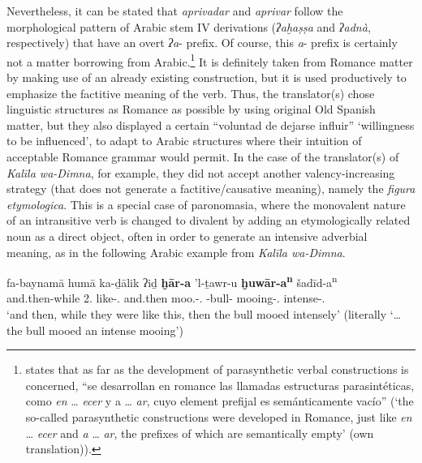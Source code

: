 \documentclass[output=paper]{langscibook}
\begin{document}
Nevertheless, it can be stated that \textit{aprivadar} and \textit{aprivar} follow the morphological pattern of Arabic stem IV derivations (\textit{ʔaḫaṣṣa} and \textit{ʔadnà}, respectively) that have an overt \textit{ʔa}- prefix. Of course, this \textit{a}- prefix is certainly not a matter borrowing from Arabic.\footnote{\citet[189]{pharies_diccionario_2002} states that as far as the development of parasynthetic verbal constructions is concerned, “se desarrollan en romance las llamadas estructuras parasintéticas, como \textit{en} … \textit{ecer} y a … \textit{ar}, cuyo element prefijal es semánticamente vacío” (‘the so-called parasynthetic constructions were developed in Romance, just like \textit{en} … \textit{ecer} and \textit{a} … \textit{ar}, the prefixes of which are semantically empty’ (own translation)).} It is definitely taken from Romance matter by making use of an already existing construction, but it is used productively to emphasize the factitive meaning of the verb. Thus, the translator(s) chose linguistic structures as Romance as possible by using original Old Spanish matter, but they also displayed a certain “voluntad de dejarse influir” \citep[230]{galmes_de_fuentes_influencia_1996} ‘willingness to be influenced’, to adapt to Arabic structures where their intuition of acceptable Romance grammar would permit. In the case of the translator(s) of \textit{Kalīla wa-Dimna}, for example, they did not accept another valency-increasing strategy (that does not generate a factitive/causative meaning), namely the \textit{figura etymologica}. This is a special case of paronomasia, where the monovalent nature of an intransitive verb is changed to divalent by adding an etymologically related noun as a direct object, often in order to generate an intensive adverbial meaning, as in the following Arabic example from \textit{Kalīla wa-Dimna}.

\begin{exe}
    \ex\label{doehla:ex:12}
    \gll fa-baynamā humā ka-ḏālik ʔiḏ \textbf{ḫār-a} 'l-ṯawr-u {\textbf{ḫuwār-a\textsuperscript{n}}} {šadīd-a\textsuperscript{n}} \\
    and.then-while 2.\DU{} like-\DEM.\DIST{} and.then moo.\PFV-\Third\SG.\M{} \Def-bull-\NOM{} mooing-\ACC.\INDF{} intense-\ACC.\INDF{} \\
    \glt ‘and then, while they were like this, then the bull mooed 	intensely’ (literally ‘… the bull mooed an intense mooing’) \citep[fo. 30r/v]{ibn_al-muqaffa_kitab_nodate}
\end{exe}
\end{document}
